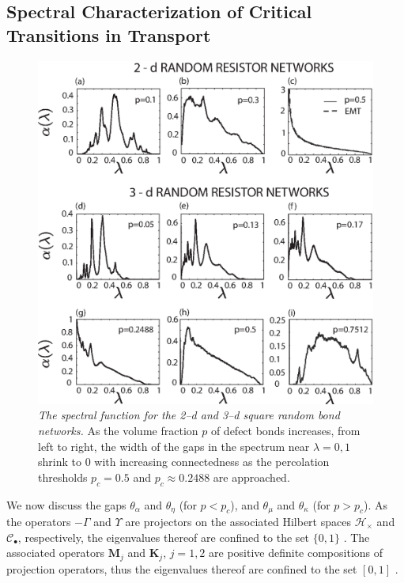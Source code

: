 \documentclass[english,12pt,jmp,graphicx]{revtex4-1}
\begin{document}
\subsection{Spectral Characterization of Critical Transitions in
  Transport} \label{sec:Spectral_Gap}  
%
%
\begin{figure}\label{fig:2D-RBN}
\includegraphics[width=35pc]{2-3-d_Random_Resistor_Networks.eps}%
\caption{\emph{The spectral function for the 2--d and 3--d square random bond
    networks.} As the volume fraction $p$ of defect bonds increases,
  from left to right, the width of the gaps in the spectrum near
  $\lambda=0,1$ shrink to 0 with increasing connectedness as the percolation
  thresholds $p_c=0.5$ and $p_c\approx0.2488$ are approached.}%
\end{figure}
%
We now discuss the gaps $\theta_\alpha$ and $\theta_\eta$ (for $p<p_c$), and $\theta_\mu$ and
$\theta_\kappa$ (for $p>p_c$). As the operators $-\Gamma$ and $\Upsilon$ are projectors on
the associated Hilbert spaces $\mathscr{H}_\times$ and $\mathscr{C}_\bullet$,
respectively, the eigenvalues thereof are confined to the set $\{0,1\}$
\cite{Reed-1980}. The associated operators $\mathbf{M}_j$ and $\mathbf{K}_j$,
$j=1,2$ are positive definite compositions of projection operators,
thus the eigenvalues thereof are confined to the set $[0,1]$
\cite{Golden:CMP-467}.
\end{document}
